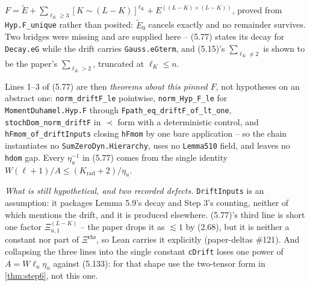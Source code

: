 \begin{theorem}\label{thm:driftdef}
  \leanok{}
  $F=\tilde E+\sum_{\ell_K\ge3}[K\sim(L-K)]^{\ell_K}+E^{((L-K)\times(L-K))}$, proved from
  \texttt{Hyp.F\_unique} rather than posited: $\tilde E_0$ cancels exactly and no remainder
  survives.  Two bridges were missing and are supplied here -- (5.77) states its decay for
  \texttt{Decay.eG} while the drift carries \texttt{Gauss.eGterm}, and (5.15)'s
  $\sum_{\ell_K\ne2}$ is shown to be the paper's $\sum_{\ell_K>2}$, truncated at $\ell_K\le n$.

  Lines 1--3 of (5.77) are then \emph{theorems about this pinned $F$}, not hypotheses on an
  abstract one: \texttt{norm\_driftF\_le} pointwise, \texttt{norm\_Hyp\_F\_le} for
  \texttt{MomentDuhamel.Hyp.F} through \texttt{Fpath\_eq\_driftF\_of\_lt\_one},
  \texttt{stochDom\_norm\_driftF} in $\prec$ form with a deterministic control, and
  \texttt{hFmom\_of\_driftInputs} closing \texttt{hFmom} by one bare application -- so the chain
  instantiates no \texttt{SumZeroDyn.Hierarchy}, uses no \texttt{Lemma510} field, and leaves no
  \texttt{hdom} gap.  Every $\eta_u^{-1}$ in (5.77) comes from the single identity
  $W(\ell+1)/A\le(K_{\mathrm{rad}}+2)/\eta_u$.

  \emph{What is still hypothetical, and two recorded defects.}  \texttt{DriftInputs} is an
  assumption: it packages Lemma 5.9's decay and Step 3's counting, neither of which mentions the
  drift, and it is produced elsewhere.  (5.77)'s third line is short one factor
  $\Xi^{(L-K)}_{u,1}$ -- the paper drops it as $\lesssim1$ by (2.68), but it is neither a constant
  nor part of $\Xi^{\mathrm{rhs}}$, so Lean carries it explicitly (paper-deltas \#121).  And
  collapsing the three lines into the single constant \texttt{cDrift} loses one power of
  $A=W\ell_u\eta_u$ against (5.133): for that shape use the two-tensor form in
  \ref{thm:step6}, not this one.
\end{theorem}

